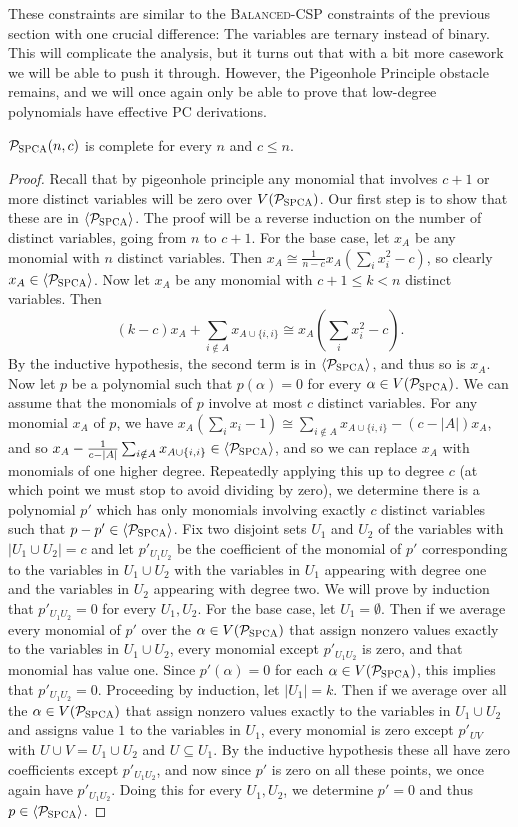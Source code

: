 These constraints are similar to the \textsc{Balanced-CSP} constraints of the previous section with one crucial difference: The variables are ternary instead of binary.
This will complicate the analysis, but it turns out that with a bit more casework we will be able to push it through.
However, the Pigeonhole Principle obstacle remains, and we will once again only be able to prove that low-degree polynomials have effective PC derivations.
\begin{lemma}\label{lem:bspca-complete}
$\mathcal P_{\textsc{SPCA}}(n,c)$ is complete for every $n$ and $c \leq n$.
\end{lemma}
\begin{proof}
Recall that by pigeonhole principle any monomial that involves $c+1$ or more distinct variables will be zero over $V(\mathcal P_{\textsc{SPCA}})$. Our first step is to show that these are in $\langle \mathcal P_{\textsc{SPCA}} \rangle$. The proof will be a reverse induction on the number of distinct variables, going from $n$ to $c+1$.  
For the base case, let $x_A$ be any monomial with $n$ distinct variables. Then $x_A \cong \frac{1}{n-c} x_A(\sum_i x_i^2 - c)$, so clearly $x_A \in \langle \mathcal P_{\textsc{SPCA}} \rangle$.
Now let $x_A$ be any monomial with $c+1 \leq k < n$ distinct variables. Then
\[\left(k-c\right)x_A + \sum_{i \notin A} x_{A \cup \{i,i\}} \cong x_A(\sum_i x^2_i - c).\]
By the inductive hypothesis, the second term is in $\langle \mathcal P_{\textsc{SPCA}} \rangle$, and thus so is $x_A$. 
Now let $p$ be a polynomial such that $p(\alpha) = 0$ for every $\alpha \in V(\mathcal P_{\textsc{SPCA}})$. 
We can assume that the monomials of $p$ involve at most $c$ distinct variables. For any monomial $x_A$ of $p$, we have $x_A(\sum_i x_i - 1) \cong \sum_{i \notin A} x_{A \cup \{i,i\}} - (c-|A|)x_A$, and so $x_A - \frac{1}{c - |A|}\sum_{i \notin A} x_{A \cup \{i,i\}} \in \langle \mathcal P_{\textsc{SPCA}} \rangle$, and so we can replace $x_A$ with monomials of one higher degree. Repeatedly applying this up to degree $c$ (at which point we must stop to avoid dividing by zero), we determine there is a polynomial $p'$ which has only monomials involving exactly $c$ distinct variables such that $p - p' \in \langle \mathcal P_{\textsc{SPCA}} \rangle$. Fix two disjoint sets $U_1$ and $U_2$ of the variables with $|U_1 \cup U_2| = c$ and let $p'_{U_1U_2}$ be the coefficient of the monomial of $p'$ corresponding to the variables in $U_1 \cup U_2$ with the variables in $U_1$ appearing with degree one and the variables in $U_2$ appearing with degree two. We will prove by induction that $p'_{U_1U_2} = 0$ for every $U_1,U_2$. For the base case, let $U_1 = \emptyset$. Then if we average every monomial of $p'$ over the $\alpha \in V(\mathcal P_{\textsc{SPCA}})$ that assign nonzero values exactly to the variables in $U_1 \cup U_2$, every monomial except $p'_{U_1U_2}$ is zero, and that monomial has value one. Since $p'(\alpha) = 0$ for each $\alpha \in V(\mathcal P_{\textsc{SPCA}})$, this implies that $p'_{U_1U_2} = 0$. Proceeding by induction, let $|U_1| = k$. Then if we average over all the $\alpha \in V(\mathcal P_{\textsc{SPCA}})$ that assign nonzero values exactly to the variables in $U_1 \cup U_2$ and assigns value $1$ to the variables in $U_1$, every monomial is zero except $p'_{UV}$ with $U \cup V = U_1 \cup U_2$ and $U \subseteq U_1$. By the inductive hypothesis these all have zero coefficients except $p'_{U_1U_2}$, and now since $p'$ is zero on all these points, we once again have $p'_{U_1U_2}$. Doing this for every $U_1,U_2$, we determine $p' = 0$ and thus $p \in \langle \mathcal P_{\textsc{SPCA}} \rangle$. 

\end{proof}
